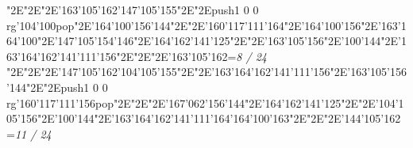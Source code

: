 \null\vfill\enskip\enskip\enskip\ipa\char"2E\enskip\enskip\enskip\ipa\char"2E\enskip\ipa\char"2E\ipa\char'163\ipa\char'105\ipa\char'162\bigskip\ipa\char'147\ipa\char'105\ipa\char'155\ipa\char"2E\enskip\enskip\enskip\ipa\char"2E\enskip\enskip\enskip\enskip\enskip\enskip\bigskip\pdfcolorstack\match push{1 0 0 rg}\ipa\char'104\ipa\char'100\pdfcolorstack\match pop{}\ipa\char"2E\ipa\char'164\ipa\char'100\ipa\char'156\ipa\char'144\ipa\char"2E\enskip\ipa\char"2E\ipa\char'160\ipa\char'117\ipa\char'111\ipa\char'164\ipa\char"2E\ipa\char'164\ipa\char'100\ipa\char'156\ipa\char"2E\ipa\char'163\ipa\char'164\ipa\char'100\ipa\char"2E\ipa\char'147\ipa\char'105\ipa\char'154\ipa\char'146\bigskip\enskip\ipa\char"2E\ipa\char'164\ipa\char'162\ipa\char'141\ipa\char'125\ipa\char"2E\enskip\enskip\ipa\char"2E\ipa\char'163\ipa\char'105\ipa\char'156\ipa\char"2E\ipa\char'100\ipa\char'144\ipa\char"2E\ipa\char'163\ipa\char'164\ipa\char'162\ipa\char'141\ipa\char'111\ipa\char'156\bigskip\enskip\enskip\enskip\ipa\char"2E\enskip\enskip\ipa\char"2E\enskip\enskip\enskip\ipa\char"2E\ipa\char'163\ipa\char'105\ipa\char'162\bigskip\vfill\footline={\hfill\tenrm\it 8 / 24}\eject
\null\vfill\enskip\enskip\enskip\ipa\char"2E\enskip\enskip\enskip\ipa\char"2E\enskip\ipa\char"2E\ipa\char'147\ipa\char'105\ipa\char'162\bigskip\ipa\char'104\ipa\char'105\ipa\char'155\ipa\char"2E\enskip\enskip\enskip\ipa\char"2E\ipa\char'163\ipa\char'164\ipa\char'162\ipa\char'141\ipa\char'111\ipa\char'156\bigskip\enskip\enskip\ipa\char"2E\ipa\char'163\ipa\char'105\ipa\char'156\ipa\char'144\ipa\char"2E\enskip\ipa\char"2E\pdfcolorstack\match push{1 0 0 rg}\ipa\char'160\ipa\char'117\ipa\char'111\ipa\char'156\pdfcolorstack\match pop{}\ipa\char"2E\enskip\enskip\enskip\ipa\char"2E\enskip\enskip\enskip\ipa\char"2E\ipa\char'167\ipa\char'062\ipa\char'156\ipa\char'144\bigskip\enskip\ipa\char"2E\ipa\char'164\ipa\char'162\ipa\char'141\ipa\char'125\ipa\char"2E\enskip\enskip\ipa\char"2E\ipa\char'104\ipa\char'105\ipa\char'156\ipa\char"2E\ipa\char'100\ipa\char'144\ipa\char"2E\ipa\char'163\ipa\char'164\ipa\char'162\ipa\char'141\ipa\char'111\ipa\char'164\bigskip\ipa\char'164\ipa\char'100\ipa\char'163\ipa\char"2E\enskip\enskip\ipa\char"2E\enskip\enskip\enskip\ipa\char"2E\ipa\char'144\ipa\char'105\ipa\char'162\bigskip\vfill\footline={\hfill\tenrm\it 11 / 24}\eject
